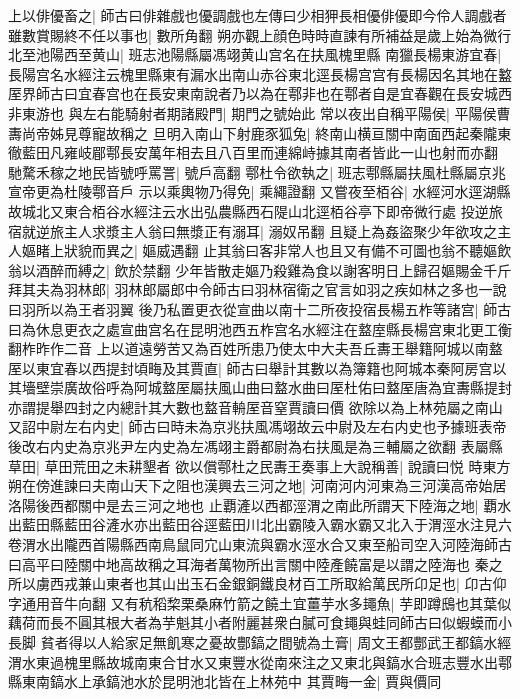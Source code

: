 上以俳優畜之|{
	師古曰俳雜戲也優調戲也左傳曰少相狎長相優俳優即今伶人調戲者}
雖數賞賜終不任以事也|{
	數所角翻}
朔亦觀上顔色時時直諫有所補益是歲上始為微行北至池陽西至黄山|{
	班志池陽縣屬馮翊黄山宫名在扶風槐里縣}
南獵長楊東游宜春|{
	長陽宫名水經注云槐里縣東有漏水出南山赤谷東北逕長楊宫宫有長楊因名其地在盭厔界師古曰宜春宫也在長安東南說者乃以為在鄠非也在鄠者自是宜春觀在長安城西非東游也}
與左右能騎射者期諸殿門|{
	期門之號始此}
常以夜出自稱平陽侯|{
	平陽侯曹夀尚帝姊見尊寵故稱之}
旦明入南山下射鹿豕狐兔|{
	終南山横亘關中南面西起秦隴東徹藍田凡雍岐郿鄠長安萬年相去且八百里而連綿峙據其南者皆此一山也射而亦翻}
馳騖禾稼之地民皆號呼罵詈|{
	號戶高翻}
鄠杜令欲執之|{
	班志鄠縣屬扶風杜縣屬京兆宣帝更為杜陵鄠音戶}
示以乘輿物乃得免|{
	乘繩證翻}
又嘗夜至栢谷|{
	水經河水逕湖縣故城北又東合栢谷水經注云水出弘農縣西石隄山北逕栢谷亭下即帝微行處}
投逆旅宿就逆旅主人求漿主人翁曰無漿正有溺耳|{
	溺奴吊翻}
且疑上為姦盜聚少年欲攻之主人嫗睹上狀貌而異之|{
	嫗威遇翻}
止其翁曰客非常人也且又有備不可圖也翁不聽嫗飲翁以酒醉而縛之|{
	飲於禁翻}
少年皆散走嫗乃殺雞為食以謝客明日上歸召嫗賜金千斤拜其夫為羽林郎|{
	羽林郎屬郎中令師古曰羽林宿衛之官言如羽之疾如林之多也一說曰羽所以為王者羽翼}
後乃私置更衣從宣曲以南十二所夜投宿長楊五柞等諸宫|{
	師古曰為休息更衣之處宣曲宫名在昆明池西五柞宫名水經注在盩庢縣長楊宫東北更工衡翻柞昨作二音}
上以道遠勞苦又為百姓所患乃使太中大夫吾丘夀王舉籍阿城以南盩厔以東宜春以西提封頃畮及其賈直|{
	師古曰舉計其數以為簿籍也阿城本秦阿房宫以其墻壁崇廣故俗呼為阿城盩厔屬扶風山曲曰盩水曲曰厔杜佑曰盩厔唐為宜夀縣提封亦謂提舉四封之内總計其大數也盩音輈厔音窒賈讀曰價}
欲除以為上林苑屬之南山又詔中尉左右内史|{
	師古曰時未為京兆扶風馮翊故云中尉及左右内史也予據班表帝後改右内史為京兆尹左内史為左馮翊主爵都尉為右扶風是為三輔屬之欲翻}
表屬縣草田|{
	草田荒田之未耕墾者}
欲以償鄠杜之民夀王奏事上大說稱善|{
	說讀曰悦}
時東方朔在傍進諫曰夫南山天下之阻也漢興去三河之地|{
	河南河内河東為三河漢高帝始居洛陽後西都關中是去三河之地也}
止覇滻以西都涇渭之南此所謂天下陸海之地|{
	覇水出藍田縣藍田谷滻水亦出藍田谷逕藍田川北出霸陵入霸水霸又北入于渭涇水注見六卷渭水出隴西首陽縣西南鳥鼠同宂山東流與霸水涇水合又東至船司空入河陸海師古曰高平曰陸關中地高故稱之耳海者萬物所出言關中陸產饒富是以謂之陸海也}
秦之所以虜西戎兼山東者也其山出玉石金銀銅鐵良材百工所取給萬民所卬足也|{
	卬古仰字通用音牛向翻}
又有秔稻棃栗桑麻竹箭之饒土宜薑芋水多䵷魚|{
	芋即蹲䲭也其葉似藕荷而長不圓其根大者為芋魁其小者附麗甚衆白膩可食䵷與蛙同師古曰似蝦蟆而小長脚}
貧者得以人給家足無飢寒之憂故酆鎬之間號為土膏|{
	周文王都酆武王都鎬水經渭水東過槐里縣故城南東合甘水又東豐水從南來注之又東北與鎬水合班志豐水出鄠縣東南鎬水上承鎬池水於昆明池北皆在上林苑中}
其賈畮一金|{
	賈與價同}
